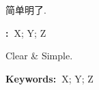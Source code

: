 \newpage
\pagestyle{empty}
\setcounter{page}{1}

\printabstract


简单明了.

\textbf{:~}X; Y; Z

\newpage

\printenglishabstract


Clear \& Simple.

\noindent\textbf{Keywords:~}X; Y; Z